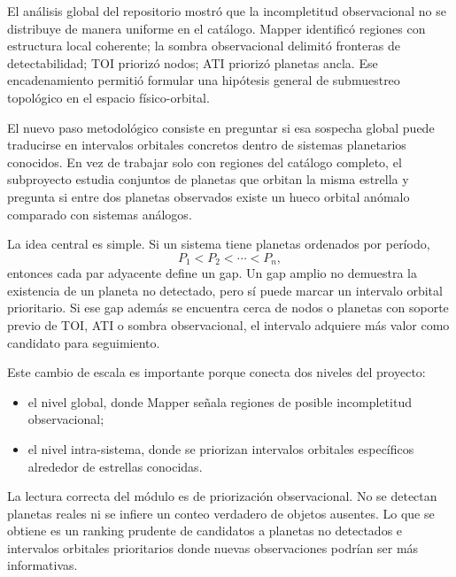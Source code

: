El an\'alisis global del repositorio mostr\'o que la incompletitud observacional no se distribuye de manera uniforme en el cat\'alogo. Mapper identific\'o regiones con estructura local coherente; la sombra observacional delimit\'o fronteras de detectabilidad; TOI prioriz\'o nodos; ATI prioriz\'o planetas ancla. Ese encadenamiento permiti\'o formular una hip\'otesis general de submuestreo topol\'ogico en el espacio f\'isico-orbital.

El nuevo paso metodol\'ogico consiste en preguntar si esa sospecha global puede traducirse en intervalos orbitales concretos dentro de sistemas planetarios conocidos. En vez de trabajar solo con regiones del cat\'alogo completo, el subproyecto estudia conjuntos de planetas que orbitan la misma estrella y pregunta si entre dos planetas observados existe un hueco orbital an\'omalo comparado con sistemas an\'alogos.

La idea central es simple. Si un sistema tiene planetas ordenados por per\'iodo,
\[
P_1 < P_2 < \cdots < P_n,
\]
entonces cada par adyacente define un gap. Un gap amplio no demuestra la existencia de un planeta no detectado, pero s\'i puede marcar un intervalo orbital prioritario. Si ese gap adem\'as se encuentra cerca de nodos o planetas con soporte previo de TOI, ATI o sombra observacional, el intervalo adquiere m\'as valor como candidato para seguimiento.

Este cambio de escala es importante porque conecta dos niveles del proyecto:
\begin{itemize}
\item el nivel global, donde Mapper se\~nala regiones de posible incompletitud observacional;
\item el nivel intra-sistema, donde se priorizan intervalos orbitales espec\'ificos alrededor de estrellas conocidas.
\end{itemize}

La lectura correcta del m\'odulo es de priorizaci\'on observacional. No se detectan planetas reales ni se infiere un conteo verdadero de objetos ausentes. Lo que se obtiene es un ranking prudente de candidatos a planetas no detectados e intervalos orbitales prioritarios donde nuevas observaciones podr\'ian ser m\'as informativas.
